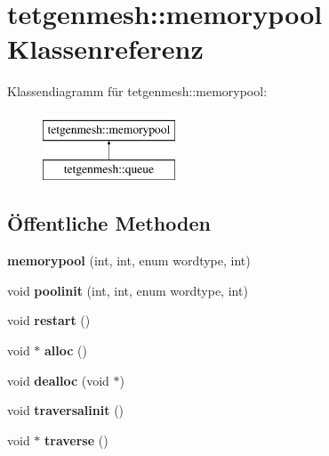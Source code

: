 \hypertarget{classtetgenmesh_1_1memorypool}{\section{tetgenmesh\-:\-:memorypool Klassenreferenz}
\label{classtetgenmesh_1_1memorypool}
}
Klassendiagramm für tetgenmesh\-:\-:memorypool\-:\begin{figure}[H]
\begin{center}
\leavevmode
\includegraphics[height=2.000000cm]{classtetgenmesh_1_1memorypool}
\end{center}
\end{figure}
\subsection*{Öffentliche Methoden}
\begin{DoxyCompactItemize}
\item 
\hypertarget{classtetgenmesh_1_1memorypool_a449ea74f5d521c07fbcc671d727719f7}{{\bfseries memorypool} (int, int, enum wordtype, int)}\label{classtetgenmesh_1_1memorypool_a449ea74f5d521c07fbcc671d727719f7}

\item 
\hypertarget{classtetgenmesh_1_1memorypool_a0b3e8b6216003461d92675f654c9e560}{void {\bfseries poolinit} (int, int, enum wordtype, int)}\label{classtetgenmesh_1_1memorypool_a0b3e8b6216003461d92675f654c9e560}

\item 
\hypertarget{classtetgenmesh_1_1memorypool_a8a34eeaa526e3a27ac9187ff1ead2938}{void {\bfseries restart} ()}\label{classtetgenmesh_1_1memorypool_a8a34eeaa526e3a27ac9187ff1ead2938}

\item 
\hypertarget{classtetgenmesh_1_1memorypool_a9631e38a788a91ae067a756232b515ab}{void $\ast$ {\bfseries alloc} ()}\label{classtetgenmesh_1_1memorypool_a9631e38a788a91ae067a756232b515ab}

\item 
\hypertarget{classtetgenmesh_1_1memorypool_a0329d16675985efd7fd1e0a0630cabf7}{void {\bfseries dealloc} (void $\ast$)}\label{classtetgenmesh_1_1memorypool_a0329d16675985efd7fd1e0a0630cabf7}

\item 
\hypertarget{classtetgenmesh_1_1memorypool_a623b101e4e2f249d8b7e5dba65c3f7e2}{void {\bfseries traversalinit} ()}\label{classtetgenmesh_1_1memorypool_a623b101e4e2f249d8b7e5dba65c3f7e2}

\item 
\hypertarget{classtetgenmesh_1_1memorypool_a151fe73459d0fa9a7262d0030fecf291}{void $\ast$ {\bfseries traverse} ()}\label{classtetgenmesh_1_1memorypool_a151fe73459d0fa9a7262d0030fecf291}

\end{DoxyCompactItemize}
